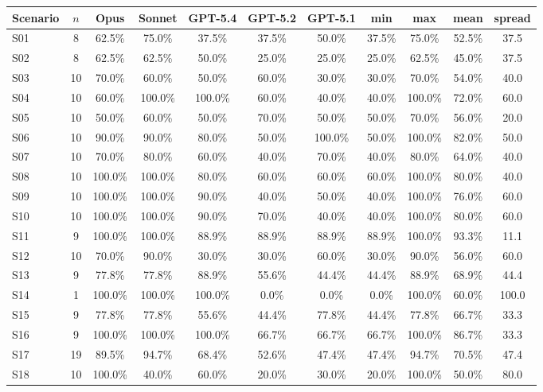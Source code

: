 \documentclass{article}
\begin{document}
\begin{table}[h]
\centering
\scriptsize
\setlength{\tabcolsep}{4pt}
\begin{tabular}{lcccccccccc}
\toprule
Scenario & $n$ & Opus & Sonnet & GPT-5.4 & GPT-5.2 & GPT-5.1 & min & max & mean & spread \\
\midrule
S01 & 8 & 62.5\% & 75.0\% & 37.5\% & 37.5\% & 50.0\% & 37.5\% & 75.0\% & 52.5\% & 37.5 \\
S02 & 8 & 62.5\% & 62.5\% & 50.0\% & 25.0\% & 25.0\% & 25.0\% & 62.5\% & 45.0\% & 37.5 \\
S03 & 10 & 70.0\% & 60.0\% & 50.0\% & 60.0\% & 30.0\% & 30.0\% & 70.0\% & 54.0\% & 40.0 \\
S04 & 10 & 60.0\% & 100.0\% & 100.0\% & 60.0\% & 40.0\% & 40.0\% & 100.0\% & 72.0\% & 60.0 \\
S05 & 10 & 50.0\% & 60.0\% & 50.0\% & 70.0\% & 50.0\% & 50.0\% & 70.0\% & 56.0\% & 20.0 \\
S06 & 10 & 90.0\% & 90.0\% & 80.0\% & 50.0\% & 100.0\% & 50.0\% & 100.0\% & 82.0\% & 50.0 \\
S07 & 10 & 70.0\% & 80.0\% & 60.0\% & 40.0\% & 70.0\% & 40.0\% & 80.0\% & 64.0\% & 40.0 \\
S08 & 10 & 100.0\% & 100.0\% & 80.0\% & 60.0\% & 60.0\% & 60.0\% & 100.0\% & 80.0\% & 40.0 \\
S09 & 10 & 100.0\% & 100.0\% & 90.0\% & 40.0\% & 50.0\% & 40.0\% & 100.0\% & 76.0\% & 60.0 \\
S10 & 10 & 100.0\% & 100.0\% & 90.0\% & 70.0\% & 40.0\% & 40.0\% & 100.0\% & 80.0\% & 60.0 \\
S11 & 9 & 100.0\% & 100.0\% & 88.9\% & 88.9\% & 88.9\% & 88.9\% & 100.0\% & 93.3\% & 11.1 \\
S12 & 10 & 70.0\% & 90.0\% & 30.0\% & 30.0\% & 60.0\% & 30.0\% & 90.0\% & 56.0\% & 60.0 \\
S13 & 9 & 77.8\% & 77.8\% & 88.9\% & 55.6\% & 44.4\% & 44.4\% & 88.9\% & 68.9\% & 44.4 \\
S14 & 1 & 100.0\% & 100.0\% & 100.0\% & 0.0\% & 0.0\% & 0.0\% & 100.0\% & 60.0\% & 100.0 \\
S15 & 9 & 77.8\% & 77.8\% & 55.6\% & 44.4\% & 77.8\% & 44.4\% & 77.8\% & 66.7\% & 33.3 \\
S16 & 9 & 100.0\% & 100.0\% & 100.0\% & 66.7\% & 66.7\% & 66.7\% & 100.0\% & 86.7\% & 33.3 \\
S17 & 19 & 89.5\% & 94.7\% & 68.4\% & 52.6\% & 47.4\% & 47.4\% & 94.7\% & 70.5\% & 47.4 \\
S18 & 10 & 100.0\% & 40.0\% & 60.0\% & 20.0\% & 30.0\% & 20.0\% & 100.0\% & 50.0\% & 80.0 \\

\end{tabular}
\end{table}
\end{document}
